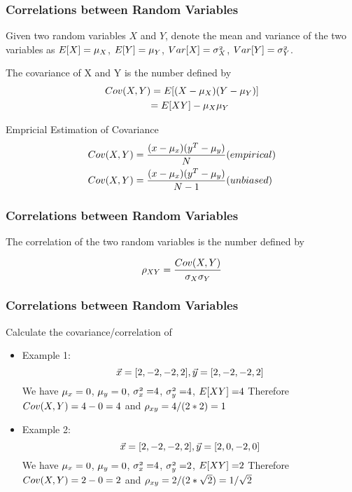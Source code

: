 \documentclass[notheorems, aspectratio=54]{beamer}
\begin{document}
\begin{frame}
\frametitle{Correlations between Random Variables}
Given two random variables $X$ and $Y$, denote the mean and variance of the two variables as $\mathnormal{E[X]=\mu_X}$, $\mathnormal{E[Y]=\mu_Y}$, $\mathnormal{Var[X]=\sigma^2_X}$, $\mathnormal{Var[Y]=\sigma^2_Y}$.

The covariance of X and Y is the number defined by
\begin{align*}
\mathnormal{Cov(X, Y)}&=\mathnormal{E[(X-\mu_X)(Y-\mu_Y)]}\\
&\mathnormal{=E[XY]-\mu_X \mu_Y}
\end{align*}

Empricial Estimation of Covariance
\begin{align*}
\mathnormal{Cov(X, Y)}&=\mathnormal{\frac{(x-\mu_x)(y^{T}-\mu_y)}{N}} (empirical)\\
\mathnormal{Cov(X, Y)}&=\frac{\mathnormal{(x-\mu_x)(y^{T}-\mu_y)}}{\mathnormal{N}-1} (unbiased)\\
\end{align*}


\end{frame}


\begin{frame}

\frametitle{Correlations between Random Variables}

The correlation of the two random variables is the number defined by 


\begin{align*}
\mathnormal{\rho_{XY}=\frac{Cov(X,Y)}{\sigma_X \sigma_Y}}
\end{align*}

\end{frame}
\begin{frame}
\frametitle{Correlations between Random Variables}
Calculate the covariance/correlation of 
\begin{itemize}
\item Example 1:$$\mathnormal{\vec{x}}=[2, -2, -2, 2], \mathnormal{\vec{y}}=[2, -2, -2, 2]$$
We have
$\mathnormal{\mu_x}=0$, $\mathnormal{\mu_y}=0$, $\mathnormal{\sigma_x^2=}4$, $\mathnormal{\sigma_y^2=}4$, $\mathnormal{E[XY]=}4$
Therefore $\mathnormal{Cov(X, Y)}=4-0=4$ and $\mathnormal{\rho_{xy}}=4/(2*2)=1$

\item Example 2: $$\mathnormal{\vec{x}}=[2, -2, -2, 2], \mathnormal{\vec{y}}=[2, 0, -2, 0]$$
We have
$\mathnormal{\mu_x}=0$, $\mathnormal{\mu_y}=0$, $\mathnormal{\sigma_x^2=}4$, $\mathnormal{\sigma_y^2=}2$, $\mathnormal{E[XY]=}2$
Therefore $\mathnormal{Cov(X, Y)}=2-0=2$ and $\mathnormal{\rho_{xy}}=2/(2*\sqrt{2})=1/\sqrt{2}$
\end{itemize}



\end{frame}
\end{document}
